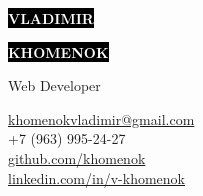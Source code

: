 \documentclass[9pt]{template}
\begin{document}
\begin{minipage}[t]{0.55\textwidth}
	\vspace{-\baselineskip}
		
	\colorbox{black}{{\HUGE\textcolor{white}{\textbf{\MakeUppercase{Vladimir}}}}}
		
	\colorbox{black}{{\HUGE\textcolor{white}{\textbf{\MakeUppercase{Khomenok}}}}}
		
	\vspace{6pt}
		
	{\huge Web Developer}
\end{minipage}
\begin{minipage}[t]{0.275\textwidth}
		
	\vspace{-\baselineskip}	
	\href{mailto:khomenokvladimir@gmail.com}{khomenokvladimir@gmail.com}\\
	+7 (963) 995-24-27\\ 
		
	\href{https://github.com/khomenok}{github.com/khomenok}\\
	\href{https://linkedin.com/in/v-khomenok}{linkedin.com/in/v-khomenok}
\end{minipage}

\vspace{0.5cm}


\end{document}
